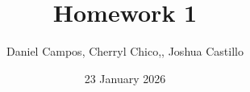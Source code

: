 \documentclass{article}
\begin{document}
\title{Homework 1}
\author{Daniel Campos, Cherryl Chico,, Joshua Castillo}
\date{23 January 2026}
\maketitle

 
\end{document}
